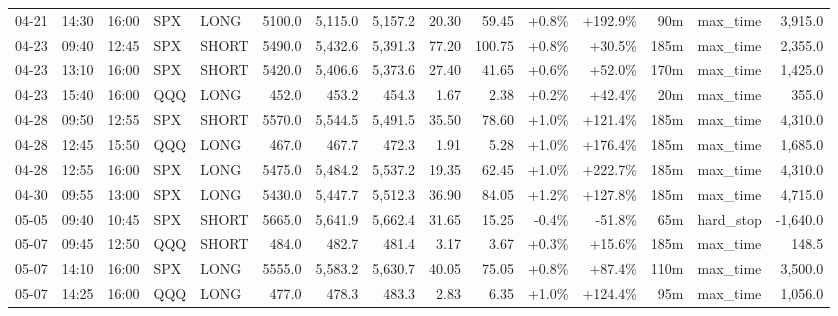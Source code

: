 \documentclass[11pt,a4paper,twoside]{article}
\begin{document}
\begin{landscape}
\begin{center}
\begin{longtable}{>{\color{txtmain}}l l l l l r r r r r r r r >{\color{txtmain}}l r}
04-21 & 14:30 & 16:00 & SPX & LONG & 5100.0 & 5,115.0 & 5,157.2 & 20.30 & 59.45 & \textcolor{wingreen}{+0.8\%} & \textcolor{wingreen}{+192.9\%} & 90m & max\_time & \textcolor{wingreen}{3,915.0} \\
04-23 & 09:40 & 12:45 & SPX & SHORT & 5490.0 & 5,432.6 & 5,391.3 & 77.20 & 100.75 & \textcolor{wingreen}{+0.8\%} & \textcolor{wingreen}{+30.5\%} & 185m & max\_time & \textcolor{wingreen}{2,355.0} \\
04-23 & 13:10 & 16:00 & SPX & SHORT & 5420.0 & 5,406.6 & 5,373.6 & 27.40 & 41.65 & \textcolor{wingreen}{+0.6\%} & \textcolor{wingreen}{+52.0\%} & 170m & max\_time & \textcolor{wingreen}{1,425.0} \\
04-23 & 15:40 & 16:00 & QQQ & LONG & 452.0 & 453.2 & 454.3 & 1.67 & 2.38 & \textcolor{wingreen}{+0.2\%} & \textcolor{wingreen}{+42.4\%} & 20m & max\_time & \textcolor{wingreen}{355.0} \\
04-28 & 09:50 & 12:55 & SPX & SHORT & 5570.0 & 5,544.5 & 5,491.5 & 35.50 & 78.60 & \textcolor{wingreen}{+1.0\%} & \textcolor{wingreen}{+121.4\%} & 185m & max\_time & \textcolor{wingreen}{4,310.0} \\
04-28 & 12:45 & 15:50 & QQQ & LONG & 467.0 & 467.7 & 472.3 & 1.91 & 5.28 & \textcolor{wingreen}{+1.0\%} & \textcolor{wingreen}{+176.4\%} & 185m & max\_time & \textcolor{wingreen}{1,685.0} \\
04-28 & 12:55 & 16:00 & SPX & LONG & 5475.0 & 5,484.2 & 5,537.2 & 19.35 & 62.45 & \textcolor{wingreen}{+1.0\%} & \textcolor{wingreen}{+222.7\%} & 185m & max\_time & \textcolor{wingreen}{4,310.0} \\
04-30 & 09:55 & 13:00 & SPX & LONG & 5430.0 & 5,447.7 & 5,512.3 & 36.90 & 84.05 & \textcolor{wingreen}{+1.2\%} & \textcolor{wingreen}{+127.8\%} & 185m & max\_time & \textcolor{wingreen}{4,715.0} \\
05-05 & 09:40 & 10:45 & SPX & SHORT & 5665.0 & 5,641.9 & 5,662.4 & 31.65 & 15.25 & \textcolor{lossred}{-0.4\%} & \textcolor{lossred}{-51.8\%} & 65m & hard\_stop & \textcolor{lossred}{-1,640.0} \\
05-07 & 09:45 & 12:50 & QQQ & SHORT & 484.0 & 482.7 & 481.4 & 3.17 & 3.67 & \textcolor{wingreen}{+0.3\%} & \textcolor{wingreen}{+15.6\%} & 185m & max\_time & \textcolor{wingreen}{148.5} \\
05-07 & 14:10 & 16:00 & SPX & LONG & 5555.0 & 5,583.2 & 5,630.7 & 40.05 & 75.05 & \textcolor{wingreen}{+0.8\%} & \textcolor{wingreen}{+87.4\%} & 110m & max\_time & \textcolor{wingreen}{3,500.0} \\
05-07 & 14:25 & 16:00 & QQQ & LONG & 477.0 & 478.3 & 483.3 & 2.83 & 6.35 & \textcolor{wingreen}{+1.0\%} & \textcolor{wingreen}{+124.4\%} & 95m & max\_time & \textcolor{wingreen}{1,056.0} \\

\end{longtable}
\end{center}
\end{landscape}
\end{document}
